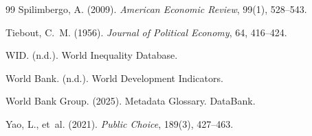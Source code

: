 \documentclass[12pt]{article}
\begin{document}
\begin{thebibliography}{99}
Spilimbergo, A. (2009). \textit{American Economic Review}, 99(1), 528--543.

Tiebout, C.~M. (1956). \textit{Journal of Political Economy}, 64, 416--424.

WID. (n.d.). World Inequality Database.

World Bank. (n.d.). World Development Indicators.

World Bank Group. (2025). Metadata Glossary. DataBank.

Yao, L., et~al. (2021). \textit{Public Choice}, 189(3), 427--463.

\end{thebibliography}
\end{document}
